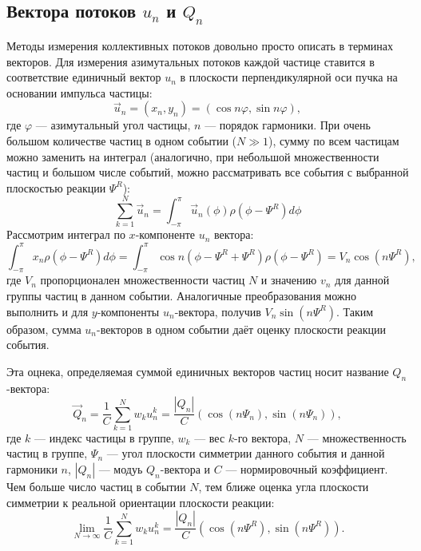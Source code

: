 \subsection{Вектора потоков $u_n$ и $Q_n$}

Методы измерения коллективных потоков довольно просто описать в терминах векторов.
Для измерения азимутальных потоков каждой частице ставится в соответствие единичный вектор $u_n$ в плоскости перпендикулярной оси пучка на основании импульса частицы:
%
\begin{equation}
    \vec{u}_n = (x_n, y_n) = ( \cos n \varphi, \sin n \varphi ),
\end{equation}
%
где $\varphi$ --- азимутальный угол частицы, $n$ --- порядок гармоники. 
При очень большом количестве частиц в одном событии ($N \gg 1$), сумму по всем частицам можно заменить на интеграл (аналогично, при небольшой множественности частиц и большом числе событий, можно рассматривать все события с выбранной плоскостью реакции $\Psi^R$):
%
\begin{equation}
    \sum_{k=1}^{N} \vec{u}_n = \int_{-\pi}^{\pi} \vec{u}_n(\phi) \rho(\phi-\Psi^R) d\phi
\end{equation}
Рассмотрим интеграл по $x$-компоненте $u_n$ вектора:
%
\begin{equation}
    \int_{-\pi}^{\pi} x_n \rho(\phi-\Psi^R) d\phi =
    \int_{-\pi}^{\pi} \cos n ( \phi - \Psi^R + \Psi^R ) \rho(\phi - \Psi^R) = V_n \cos (n\Psi^R), 
\end{equation}
где $V_n$ пропорционален множественности частиц $N$ и значению $v_n$ для данной группы частиц в данном событии.
Аналогичные преобразования можно выполнить и для $y$-компоненты $u_n$-вектора, получив $V_n\sin(n\Psi^R)$.
Таким образом, сумма $u_n$-векторов в одном событии даёт оценку плоскости реакции события.

Эта оцнека, определяемая суммой единичных векторов частиц носит название $Q_n$-вектора:
%
\begin{equation}
    \vec{Q}_n = \frac{1}{C} \sum_{k=1}^{N} w_k u_n^k = \frac{|Q_n|}{C} (\cos{(n\Psi_n)}, \sin{(n\Psi_n)}),
    \label{eq:track_qn}
\end{equation}
%
где $k$ --- индекс частицы в группе, $w_k$ --- вес $k$-го вектора, $N$ --- множественность частиц в группе, $\Psi_n$ --- угол плоскости симметрии данного события и данной гармоники $n$, $|Q_n|$ --- модуь $Q_n$-вектора и $C$ --- нормировочный коэффициент. 
Чем больше число частиц в событии $N$, тем ближе оценка угла плоскости симметрии к реальной ориентации плоскости реакции:
%
\begin{equation}
    \lim_{N \xrightarrow{} \infty} \frac{1}{C} \sum_{k=1}^{N} w_k u_n^k = \frac{|Q_n|}{C} (\cos (n\Psi^R), \sin (n\Psi^R) ) .
\end{equation}

